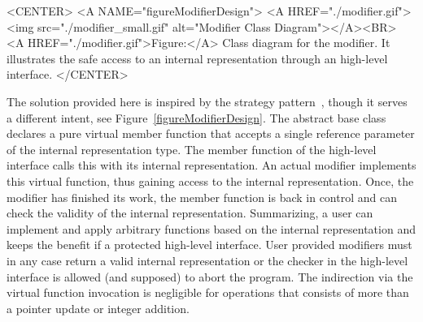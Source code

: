 \begin{ccHtmlOnly}
    <CENTER>
    <A NAME="figureModifierDesign">
    <A HREF="./modifier.gif">
        <img src="./modifier_small.gif" alt="Modifier Class Diagram"></A><BR>
    <A HREF="./modifier.gif">Figure:</A>
             Class diagram for the modifier. It illustrates the safe access
             to an internal representation through an high-level interface.
    </CENTER>
\end{ccHtmlOnly}

The solution provided here is inspired by the strategy
pattern~\cite{ghjv-dpero-95}, though it serves a different intent, see
Figure~\ref{figureModifierDesign}.  The abstract base class
 declares a pure virtual member function
 that accepts a single reference parameter of the
internal representation type. The member function  of
the high-level interface calls this  with its internal
representation.  An actual modifier implements this virtual function,
thus gaining access to the internal representation. Once, the modifier
has finished its work, the member function  is back in
control and can check the validity of the internal representation.
Summarizing, a user can implement and apply arbitrary functions based
on the internal representation and keeps the benefit if a protected
high-level interface. User provided modifiers must in any case return
a valid internal representation or the checker in the high-level
interface is allowed (and supposed) to abort the program. The
indirection via the virtual function invocation is negligible for
operations that consists of more than a pointer update or integer
addition.


